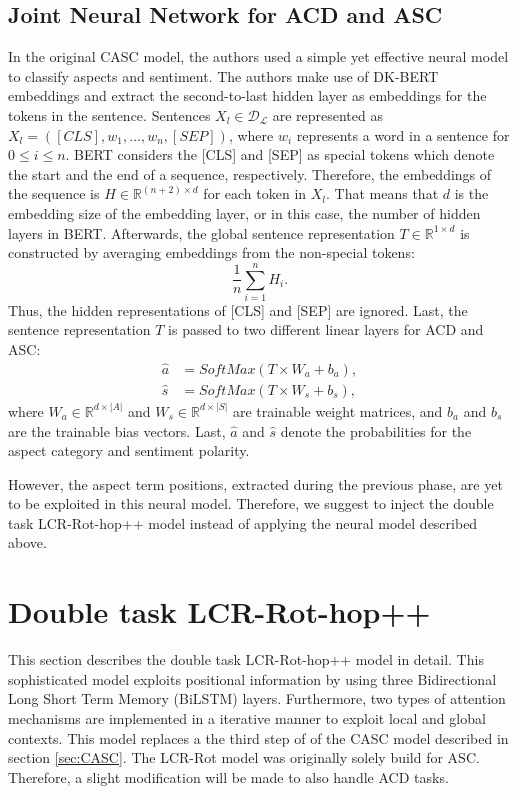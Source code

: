 \documentclass[american, oneside]{ecsgdp}
\begin{document}
\subsection{Joint Neural Network for ACD and ASC} %
In the original CASC model, the authors used a simple yet effective neural model to classify aspects and sentiment. The authors make use of DK-BERT embeddings and extract the second-to-last hidden layer as embeddings for the tokens in the sentence. Sentences $X_l \in \mathcal{D_\mathcal{L}}$ are represented as $X_l = \left ( [CLS], w_1, \ldots, w_n, [SEP] \right )$, where $w_i$ represents a word in a sentence for $0 \leq i \leq n$. BERT considers the [CLS] and [SEP] as special tokens which denote the start and the end of a sequence, respectively. Therefore, the embeddings of the sequence is $H \in \mathbb{R}^{(n+2) \times d}$ for each token in $X_l$. That means that $d$ is the embedding size of the embedding layer, or in this case, the number of hidden layers in BERT. Afterwards, the global sentence representation $T \in \mathbb{R}^{1 \times d}$ is constructed by averaging embeddings from the non-special tokens: 
\begin{equation} 
    \frac{1}{n} \sum_{i=1}^{n}H_i. 
\end{equation}
Thus, the hidden representations of [CLS] and [SEP] are ignored. Last, the sentence representation $T$ is passed to two different linear layers for ACD and ASC: 
\begin{align}
    \hat{a} & = SoftMax(T \times W_a + b_a), \\
    \hat{s} & = SoftMax(T \times W_s + b_s),
\end{align}
where $W_a \in \mathbb{R}^{d \times \lvert A \rvert}$ and $W_s \in \mathbb{R}^{d \times \lvert S \rvert}$ are trainable weight matrices, and $b_a$ and $b_s$ are the trainable bias vectors. Last, $\hat{a}$ and  $\hat{s}$ denote the probabilities for the aspect category and sentiment polarity.

However, the aspect term positions, extracted during the previous phase, are yet to be exploited in this neural model. Therefore, we suggest to inject the double task LCR-Rot-hop++ model instead of applying the neural model described above. 

\section{Double task LCR-Rot-hop++} \label{sec:LCR-Rot}
This section describes the double task LCR-Rot-hop++ model \parencite{Trusca2020HAABSA++} in detail. This sophisticated model exploits positional information by using three Bidirectional Long Short Term Memory (BiLSTM) layers. Furthermore, two types of attention mechanisms are implemented in a iterative manner to exploit local and global contexts. This model replaces a the third step of of the CASC model described in section \cref{sec:CASC}. The LCR-Rot model was originally solely build for ASC. Therefore, a slight modification will be made to also handle ACD tasks.
\end{document}
